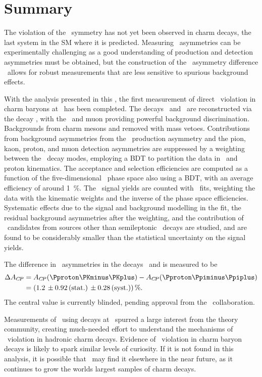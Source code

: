 \chapter{Summary}
\label{chap:cpv:summary}

The violation of the \CP\ symmetry has not yet been observed in charm decays, 
the last system in the \ac{SM} where it is predicted.
Measuring \CP\ asymmetries can be experimentally challenging as a good 
understanding of production and detection asymmetries must be obtained, but the 
construction of the \CP\ asymmetry difference \dACP\ allows for robust 
measurements that are less sensitive to spurious background effects.

With the analysis presented in this , the first 
measurement of direct \CP\ violation in charm baryons at \lhcb\ has been 
completed.
The decays \LcTopKK\ and \LcToppipi\ are reconstructed via the decay 
\LbToLcmuX, with the \PLambdab\ and muon providing powerful background 
discrimination.
Backgrounds from charm mesons and removed with mass vetoes.
Contributions from background asymmetries from the \PLambdab\ production 
asymmetry and the pion, kaon, proton, and muon detection asymmetries are 
suppressed by a weighting between the \PLambdac\ decay modes, employing a 
\acl{BDT} to partition the data in \PLambdac\ and proton kinematics.
The acceptance and selection efficiencies are computed as a function of the 
five-dimensional \PLambdac\ phase space also using a \ac{BDT}, with an average 
efficiency of around \SI{1}{\percent}.
The \PLambdac\ signal yields are counted with \chisq\ fits, weighting the data 
with the kinematic weights and the inverse of the phase space efficiencies.
Systematic effects due to the signal and background modelling in the fit, the 
residual background asymmetries after the weighting, and the contribution of 
\PLambdac\ candidates from sources other than semileptonic \PLambdac\ decays 
are studied, and are found to be considerably smaller than the statistical 
uncertainty on the signal yields.

The difference in \CP\ asymmetries in the decays \LcTopKK\ and \LcToppipi is 
measured to be
\begin{align*}
  \dACP &= \ACP(\pKK) - \ACP(\ppipi) \\
        &= \SIerrs{\deltaACPval}{\deltaACPunc}{0.28}{\percent}.
\end{align*}
The central value is currently blinded, pending approval from the \lhcb\ 
collaboration.

Measurements of \dACP\ using \PDzero decays at \lhcb\ spurred a large interest 
from the theory community, creating much-needed effort to understand the 
mechanisms of \CP\ violation in hadronic charm decays.
Evidence of \CP\ violation in charm baryon decays is likely to spark similar 
levels of curiosity.
If it is not found in this analysis, it is possible that \lhcb\ may find it 
elsewhere in the near future, as it continues to grow the worlds largest 
samples of charm decays.
